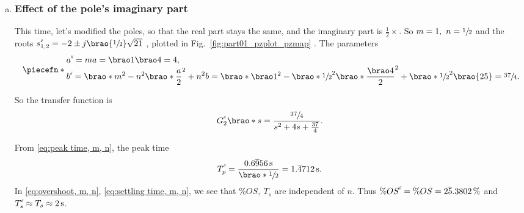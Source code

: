\documentclass[12pt]{article}
\newcommand*\siexpr[2][]{\SI[parse-numbers=false,#1]{#2}}%
\DeclarePairedDelimiter\brao()%
\DeclarePairedDelimiter\piecefn\{.
\newcommand{\setprime}[2][1]{%
    {#2}^{%
        \raisebox{1pt}{%
            \scalebox{0.5}{%
                \itshape\sffamily\uppercase%
                \expandafter{%
                    \romannumeral#1%
                }%
            }%
        }
    }%
}%
\begin{document}
\begin{enumerate}[(a)]
    \item
        \subsubsection{Effect of the pole's imaginary part}
        This time, let's modified the poles, so that the real part stays the same, and the imaginary part is $\frac12\times$.
        So $m = 1,\ n = \sfrac12$
        and the roots $\setprime[2]s_{1,2} = -2 \pm j\brao{\sfrac12}\sqrt{21}$
        , plotted in Fig.~\ref{fig:part01_pzplot_pzmap}%
        . The parameters
        \begin{equation}
            \piecefn*{
                \begin{array}{@{}l@{}}\displaystyle
                    \setprime[2]a = ma = \brao1\brao4 = 4,
                \\*\displaystyle
                      \setprime[2]b
                    = \brao*{m^2 - n^2}\brao*{\frac{a}2}^2 + n^2b
                    = \brao*{\brao1^2 - \brao*{\sfrac12}^2}\brao*{\frac{\brao4}2}^2 + \brao*{\sfrac12}^2\brao{25}
                    = \sfrac{37}4\rlap.
                \end{array}
            }
        \end{equation}

        So the transfer function is
        \begin{equation}
            \setprime[2]{G}_2\brao*s = \frac{\sfrac{37}4}{s^2 + 4s + \tfrac{37}4}.
        \end{equation}

        From \eqref{eq:peak time, m, n}, the peak time
        \begin{equation}
            \setprime[2]{T}_p = \frac{\siexpr{0.6\overline956}\second}{\brao*{\sfrac12}} = \siexpr{1.\overline4712}\second.
        \end{equation}
        In \eqref{eq:overshoot, m, n}, \eqref{eq:settling time, m, n},
        we see that $\%OS,\ T_s$ are independent of $n$.
        Thus $\%\setprime[2]{OS} = \%OS = \siexpr{2\overline5.3802}\percent$ and $\setprime[2]{T}_s \approx T_s \approx \SI2\second$.


\end{enumerate}
\end{document}
